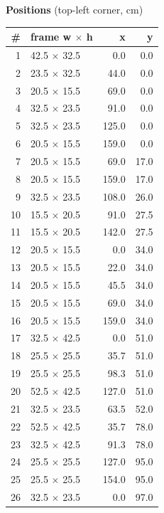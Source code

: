 \documentclass[a4paper,landscape,10pt]{article}
\begin{document}
\begin{minipage}[t]{0.25\textwidth}
\vspace{8pt}
{\bfseries Positions} (top-left corner, cm)\\[2pt]
\tiny
\begin{tabular}{@{}r l r r@{}}
\toprule
\# & frame w $\times$ h & x & y \\
\midrule
1 & 42.5 $\times$ 32.5 & 0.0 & 0.0 \\
2 & 23.5 $\times$ 32.5 & 44.0 & 0.0 \\
3 & 20.5 $\times$ 15.5 & 69.0 & 0.0 \\
4 & 32.5 $\times$ 23.5 & 91.0 & 0.0 \\
5 & 32.5 $\times$ 23.5 & 125.0 & 0.0 \\
6 & 20.5 $\times$ 15.5 & 159.0 & 0.0 \\
7 & 20.5 $\times$ 15.5 & 69.0 & 17.0 \\
8 & 20.5 $\times$ 15.5 & 159.0 & 17.0 \\
9 & 32.5 $\times$ 23.5 & 108.0 & 26.0 \\
10 & 15.5 $\times$ 20.5 & 91.0 & 27.5 \\
11 & 15.5 $\times$ 20.5 & 142.0 & 27.5 \\
12 & 20.5 $\times$ 15.5 & 0.0 & 34.0 \\
13 & 20.5 $\times$ 15.5 & 22.0 & 34.0 \\
14 & 20.5 $\times$ 15.5 & 45.5 & 34.0 \\
15 & 20.5 $\times$ 15.5 & 69.0 & 34.0 \\
16 & 20.5 $\times$ 15.5 & 159.0 & 34.0 \\
17 & 32.5 $\times$ 42.5 & 0.0 & 51.0 \\
18 & 25.5 $\times$ 25.5 & 35.7 & 51.0 \\
19 & 25.5 $\times$ 25.5 & 98.3 & 51.0 \\
20 & 52.5 $\times$ 42.5 & 127.0 & 51.0 \\
21 & 32.5 $\times$ 23.5 & 63.5 & 52.0 \\
22 & 52.5 $\times$ 42.5 & 35.7 & 78.0 \\
23 & 32.5 $\times$ 42.5 & 91.3 & 78.0 \\
24 & 25.5 $\times$ 25.5 & 127.0 & 95.0 \\
25 & 25.5 $\times$ 25.5 & 154.0 & 95.0 \\
26 & 32.5 $\times$ 23.5 & 0.0 & 97.0 \\
\bottomrule
\end{tabular}
\end{minipage}
\clearpage
\end{document}
